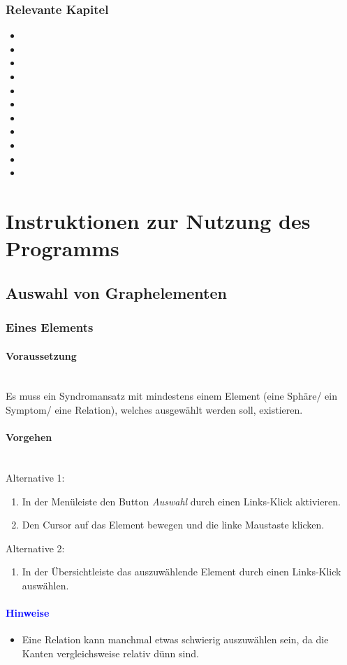 \documentclass[enabledeprecatedfontcommands,fontsize=11pt,paper=a4,twoside]{scrartcl}
\newcounter{one}
\newcommand*{\hint}{\paragraph{\textcolor{blue}{Hinweise}}}
\newcommand*{\condition}{\paragraph{Voraussetzung}$\;$ \vspace{0.2cm}\\}
\newcommand*{\actions}{\paragraph{Vorgehen} $\;$\vspace{0.2cm}\\}
\begin{document}
\subsubsection{Relevante Kapitel}
\begin{itemize}
	\item {}	
	\item {}
	\item {}
	\item {}
	\item {}
	\item {}
	\item {}
	\item {}
	\item {}
	\item {}	
	\item {}
\end{itemize}


\newpage
\section{Instruktionen zur Nutzung des Programms} \label{sec:nutzung}
	\subsection{Auswahl von Graphelementen} \label{pick}
		\subsubsection{Eines Elements}
		\condition
		Es muss ein Syndromansatz mit mindestens einem Element (eine Sphäre/ ein Symptom/ eine Relation), welches ausgewählt werden soll, existieren. 
		\actions
		Alternative 1: 
		\begin{enumerate}
			\item In der Menüleiste den Button \textit{Auswahl} durch einen Links-Klick aktivieren. 
			\item Den Cursor auf das Element bewegen und die linke Maustaste klicken. 
		\end{enumerate}
		Alternative 2: 
		\begin{enumerate}
			\item In der Übersichtleiste das auszuwählende Element durch einen Links-Klick auswählen. 
		\end{enumerate}
		\hint
		\begin{itemize}
			\item Eine Relation kann manchmal etwas schwierig auszuwählen sein, da die Kanten vergleichsweise relativ dünn sind. 
		\end{itemize}
	
\end{document}
